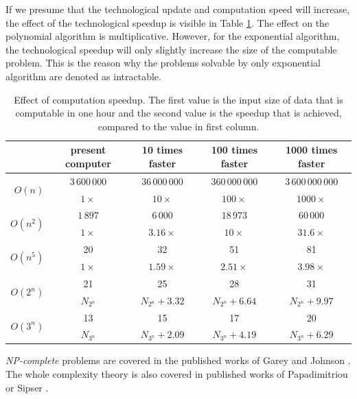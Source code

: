 If we presume that the technological update and computation speed will increase, the effect of the technological speedup is visible in Table \ref{table:speedupeffect}. The effect on the polynomial algorithm is multiplicative. However, for the exponential algorithm, the technological speedup will only slightly increase the size of the computable problem. This is the reason why the problems solvable by  only exponential algorithm are denoted as intractable. 
\begin{table}[ht]
\footnotesize
\begin{tabular}{r|c|c|c|c|}
                      & present computer   & 10 times faster               & 100 times faster               & 1000 times faster \\
\hline
\multirow{2}{*}{$O(n)$}  & $3\,600\,000$        & $36\,000\,000$         & $360\,000\,000$        & $3\,600\,000\,000$      \\
                      & $1\times$          & $10\times$   & $100\times$  & $1000\times$ \\
\hline
\multirow{2}{*}{$O(n^2)$}                 & $1\,897$ & $6\,000$             & $18\,973$ & $60\,000$            \\
                      & $1\times$          & $3.16\times$ & $10\times$   & $31.6\times$ \\
\hline
\multirow{2}{*}{$O(n^5)$}                 & 20  & 32     & 51    & 81    \\
                      & $1\times$          & $1.59\times$ & $2.51\times$ & $3.98\times$ \\
\hline
\multirow{2}{*}{$O(2^n)$}                 & 21  & 25    & 28    & 31    \\
                      & $N_{2^n}$       & $N_{2^n}+3.32$    & $N_{2^n}+6.64$    & $N_{2^n}+9.97$    \\
\hline
\multirow{2}{*}{$O(3^n)$} & 13  & 15    & 17    & 20    \\
                      & $N_{3^n}$       & $N_{3^n}+2.09$    & $N_{3^n}+4.19$     & $N_{3^n}+6.29$                  \\
                      \hline
\end{tabular}
\caption{Effect of computation speedup. The first value is the input size of data that is computable in one hour and the second value is the speedup that is achieved, compared to the value in first column. }
\label{table:speedupeffect}
\end{table}

\emph{NP-complete} problems are covered in the published works of Garey and Johnson \cite{Garey1979}. The whole complexity theory is also covered in published works of Papadimitriou \cite{Papadimitriou1995} or Sipser \cite{Sipser2012}. 

